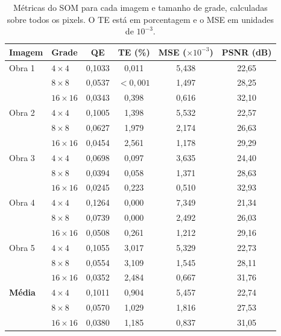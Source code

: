 \documentclass[11pt,a4paper]{article}
\begin{document}
\begin{table}[H]
  \centering
  \small
  \begin{tabular}{llcccc}
    \toprule
    Imagem & Grade & QE & TE (\%) & MSE ($\times 10^{-3}$) & PSNR (dB) \\
    \midrule
    Obra 1
      & $4 \times 4$   & 0{,}1033 & 0{,}011 & 5{,}438 & 22{,}65 \\
      & $8 \times 8$   & 0{,}0537 & $<0{,}001$ & 1{,}497 & 28{,}25 \\
      & $16 \times 16$ & 0{,}0343 & 0{,}398 & 0{,}616 & 32{,}10 \\
    \midrule
    Obra 2
      & $4 \times 4$   & 0{,}1005 & 1{,}398 & 5{,}532 & 22{,}57 \\
      & $8 \times 8$   & 0{,}0627 & 1{,}979 & 2{,}174 & 26{,}63 \\
      & $16 \times 16$ & 0{,}0454 & 2{,}561 & 1{,}178 & 29{,}29 \\
    \midrule
    Obra 3
      & $4 \times 4$   & 0{,}0698 & 0{,}097 & 3{,}635 & 24{,}40 \\
      & $8 \times 8$   & 0{,}0394 & 0{,}058 & 1{,}371 & 28{,}63 \\
      & $16 \times 16$ & 0{,}0245 & 0{,}223 & 0{,}510 & 32{,}93 \\
    \midrule
    Obra 4
      & $4 \times 4$   & 0{,}1264 & 0{,}000 & 7{,}349 & 21{,}34 \\
      & $8 \times 8$   & 0{,}0739 & 0{,}000 & 2{,}492 & 26{,}03 \\
      & $16 \times 16$ & 0{,}0508 & 0{,}261 & 1{,}212 & 29{,}16 \\
    \midrule
    Obra 5
      & $4 \times 4$   & 0{,}1055 & 3{,}017 & 5{,}329 & 22{,}73 \\
      & $8 \times 8$   & 0{,}0554 & 3{,}109 & 1{,}545 & 28{,}11 \\
      & $16 \times 16$ & 0{,}0352 & 2{,}484 & 0{,}667 & 31{,}76 \\
    \midrule
    \textbf{Média}
      & $4 \times 4$   & 0{,}1011 & 0{,}904 & 5{,}457 & 22{,}74 \\
      & $8 \times 8$   & 0{,}0570 & 1{,}029 & 1{,}816 & 27{,}53 \\
      & $16 \times 16$ & 0{,}0380 & 1{,}185 & 0{,}837 & 31{,}05 \\
    \bottomrule
  \end{tabular}
  \caption{Métricas do SOM para cada imagem e tamanho de grade, calculadas
  sobre todos os pixels. O TE está em porcentagem e o MSE em unidades de $10^{-3}$.}
  \label{tab:som-resultados}
\end{table}
\end{document}
